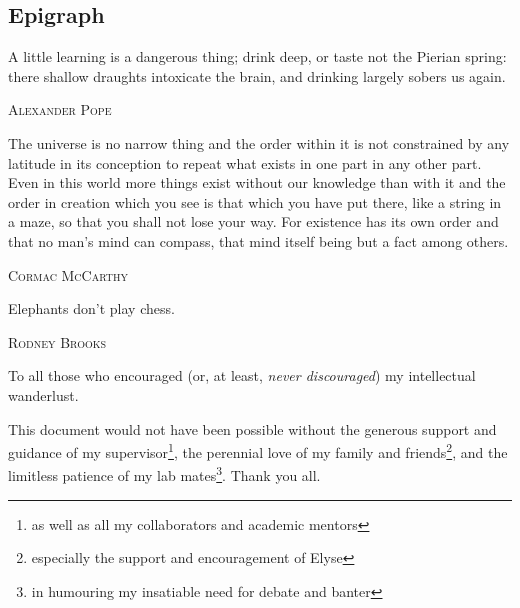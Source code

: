 \documentclass[oneandahalfspaced,twoside,12pt]{ut-thesis}
\begin{document}
\begin{preliminary}

\chapter*{Epigraph}
\epigraph{A little learning is a dangerous thing; 
drink deep, or taste not the Pierian spring: 
there shallow draughts intoxicate the brain, 
and drinking largely sobers us again.}{\textsc{Alexander Pope}}
\epigraph{The universe is no narrow thing and the order within it is not constrained by any latitude in its conception to repeat what exists in one part in any other part. Even in this world more things exist without our knowledge than with it and the order in creation which you see is that which you have put there, like a string in a maze, so that you shall not lose your way. For existence has its own order and that no man's mind can compass, that mind itself being but a fact among others.}{\textsc{Cormac McCarthy}}
\epigraph{Elephants don't play chess.}{\textsc{Rodney Brooks}}


\clearpage
	

\begin{dedication}
To all those who encouraged (or, at least, \textit{never discouraged}) my intellectual wanderlust.
\end{dedication}

\newpage  %


\begin{acknowledgements}
This document would not have been possible without the generous support and guidance of my supervisor\footnote{as well as all my collaborators and academic mentors}, the perennial love of my family and friends\footnote{especially the support and encouragement of Elyse}, and the limitless patience of my lab mates\footnote{in humouring my insatiable need for debate and banter}. Thank you all.
\end{acknowledgements}


\end{preliminary}
\end{document}
